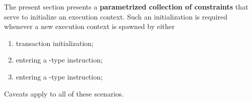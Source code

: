 The present section presents a \textbf{parametrized collection of constraints} that serve to initialize an execution context. Such an initialization is required whenever a new execution context is spawned by either
\begin{enumerate}
	\item transaction initialization;
	\item entering a -type instruction;
	\item entering a -type instruction;
\end{enumerate}
Caveats apply to all of these scenarios.

